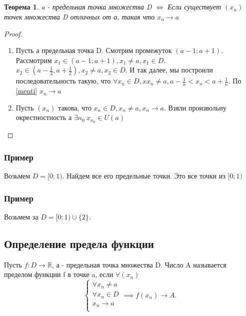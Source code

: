 \documentclass{article}
\newtheorem{theorem}{Теорема}
\begin{document}
\subsection{}
\begin{theorem}
    a - предельная точка множества D $\iff$ Если существует  $(x_n)$ точек множества D
    отличных от а, такая что $x_n \to a$
\end{theorem}
\begin{proof}
    \begin{enumerate}
        \item Пусть а предельная точка D.
            Смотрим промежуток $(a-1;a+1)$. Рассмотрим  $x_1 \in (a-1;a+1),x_1 \neq a, x_1 \in D$. $
            x_2 \in (a - \frac{1}{2},a + \frac{1}{2}), x_2 \neq a , x_2 \in D$. И так далее, мы построили последовательность такую, что $\forall x_n \in D,x x_n \neq a, a - \frac{1}{n} < x_n < a + \frac{1}{n}$. По \ref{menti} $x_n \to a$
            \item
                Пусть  $(x_n)$ такова, что  $x_n \in D,x_n \neq a, x_n \to a$. Взяли произвольну окрестностность а $\exists n_0  ~ x_{n_0} \in U(a)$
    \end{enumerate}
\end{proof}
\subsubsection{Пример}
Возьмем $D = [0;1)$. Найдем все его предельные точки. Это все точки из  $[0;1)$
\subsubsection{Пример}
Возьмем за  $D = [0;1) \cup \{2\}$.
\subsection{Определение предела функции}
Пусть $f : D \to \mathbb{R}$, а - предельная точка множества D. Число A называется пределом функции f в точке a,
если $\forall (x_n)$
\[
\begin{cases}
    \forall x_n \neq a\\
    \forall  x_n \in D\\
    x_n \to a\\
\end{cases}
\implies f(x_n) \to A
.\] 
\end{document}
